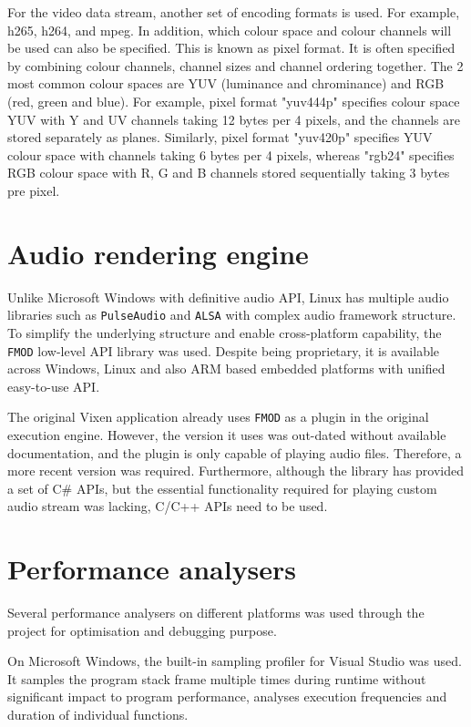 For the video data stream, another set of encoding formats is used. For example, h265, h264, and mpeg. In addition, which colour space and colour channels will be used can also be specified. This is known as pixel format. It is often specified by combining colour channels, channel sizes and channel ordering together. The 2 most common colour spaces are YUV (luminance and chrominance) and RGB (red, green and blue). For example, pixel format "yuv444p" specifies colour space YUV with Y and UV channels taking 12 bytes per 4 pixels, and the channels are stored separately as planes. Similarly, pixel format "yuv420p" specifies YUV colour space with channels taking 6 bytes per 4 pixels, whereas "rgb24" specifies RGB colour space with R, G and B channels stored sequentially taking 3 bytes pre pixel.


\section{Audio rendering engine}

Unlike Microsoft Windows with definitive audio API, Linux has multiple audio libraries such as \texttt{PulseAudio} \cite{developers2013pulseaudio} and \texttt{ALSA} \cite{alsa} with complex audio framework structure. To simplify the underlying structure and enable cross-platform capability, the \texttt{FMOD} \cite{fmod} low-level API library was used. Despite being proprietary, it is available across Windows, Linux and also ARM based embedded platforms with unified easy-to-use API.

The original Vixen application already uses \texttt{FMOD} as a plugin in the original execution engine. However, the version it uses was out-dated without available documentation, and the plugin is only capable of playing audio files. Therefore, a more recent version was required. Furthermore, although the library has provided a set of C\# APIs, but the essential functionality required for playing custom audio stream was lacking, C/C++ APIs need to be used.

\section{Performance analysers}

Several performance analysers on different platforms was used through the project for optimisation and debugging purpose.

On Microsoft Windows, the built-in sampling profiler for Visual Studio was used. It samples the program stack frame multiple times during runtime without significant impact to program performance, analyses execution frequencies and duration of individual functions.

